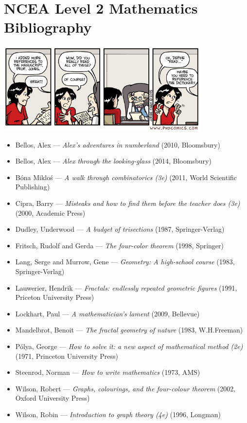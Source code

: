 


\section*{NCEA Level 2 Mathematics\\Bibliography}

\begin{center}
  \includegraphics[width=0.8\textwidth]{biblio}
\end{center}

\begin{itemize}
  \item Bellos, Alex --- \emph{Alex's adventures in numberland} (2010, Bloomsbury)
  \item Bellos, Alex --- \emph{Alex through the looking-glass} (2014, Bloomsbury)
  \item B\'ona Miklo\'s --- \emph{A walk through combinatorics (3e)} (2011, World Scientific Publishing)
  \item Cipra, Barry --- \emph{Misteaks and how to find them before the teacher does (3e)} (2000, Academic Press)
  \item Dudley, Underwood --- \emph{A budget of trisections} (1987, Springer-Verlag)
  \item Fritsch, Rudolf and Gerda --- \emph{The four-color theorem} (1998, Springer)
  \item Lang, Serge and Murrow, Gene --- \emph{Geometry: A high-school course} (1983, Springer-Verlag)
  \item Lauwerier, Hendrik --- \emph{Fractals: endlessly repeated geometric figures} (1991, Priceton University Press)
  \item Lockhart, Paul --- \emph{A mathematician's lament} (2009, Bellevue)
  \item Mandelbrot, Benoit --- \emph{The fractal geometry of nature} (1983, W.H.Freeman)
  \item P\'olya, George --- \emph{How to solve it: a new aspect of mathematical method (2e)} (1971, Princeton University Press)
  \item Steenrod, Norman --- \emph{How to write mathematics} (1973, AMS)
  \item Wilson, Robert --- \emph{Graphs, colourings, and the four-colour theorem} (2002, Oxford University Press)
  \item Wilson, Robin --- \emph{Introduction to graph theory (4e)} (1996, Longman)
\end{itemize}


